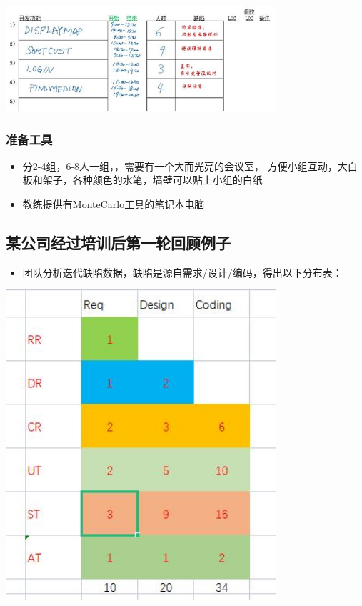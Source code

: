 \includegraphics[width=10cm]{缺陷表51.jpg}

\hypertarget{ux51c6ux5907ux5de5ux5177}{%
\subsubsection{准备工具}\label{ux51c6ux5907ux5de5ux5177}}

\begin{itemize}
\tightlist
\item
  分2-4组，6-8人一组，，需要有一个大而光亮的会议室，
  方便小组互动，大白板和架子，各种颜色的水笔，墙壁可以贴上小组的白纸
\item
  教练提供有MonteCarlo工具的笔记本电脑
\end{itemize}

\hypertarget{ux67d0ux516cux53f8ux7ecfux8fc7ux57f9ux8badux540eux7b2cux4e00ux8f6eux56deux987eux4f8bux5b50}{%
\subsection{某公司经过培训后第一轮回顾例子}\label{ux67d0ux516cux53f8ux7ecfux8fc7ux57f9ux8badux540eux7b2cux4e00ux8f6eux56deux987eux4f8bux5b50}}

\begin{itemize}
\tightlist
\item
  团队分析迭代缺陷数据，缺陷是源自需求/设计/编码，得出以下分布表：
\end{itemize}



\includegraphics[width=10cm]{微信截图_20220316093044.jpg}

